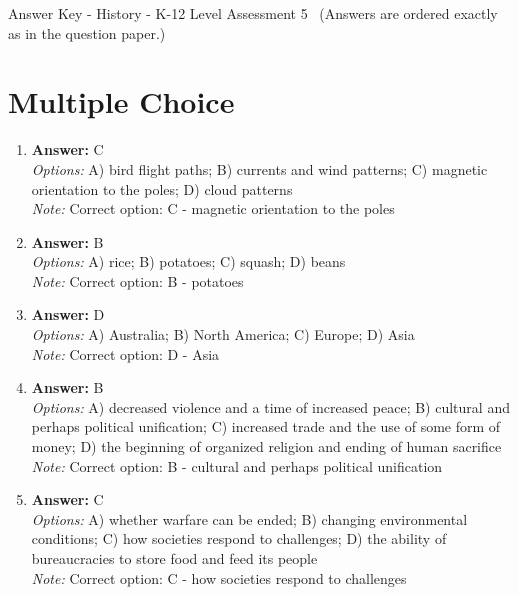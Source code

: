 \documentclass[12pt]{article}
\begin{document}
\begin{center}
Answer Key - History - K-12 Level Assessment 5 \
\small (Answers are ordered exactly as in the question paper.)
\end{center}

\section*{Multiple Choice}
\begin{enumerate}[label=\arabic*.]
\item \textbf{Answer:} C
\\ \textit{Options:} A) bird flight paths; B) currents and wind patterns; C) magnetic orientation to the poles; D) cloud patterns
\\ \textit{Note:} Correct option: C - magnetic orientation to the poles
\item \textbf{Answer:} B
\\ \textit{Options:} A) rice; B) potatoes; C) squash; D) beans
\\ \textit{Note:} Correct option: B - potatoes
\item \textbf{Answer:} D
\\ \textit{Options:} A) Australia; B) North America; C) Europe; D) Asia
\\ \textit{Note:} Correct option: D - Asia
\item \textbf{Answer:} B
\\ \textit{Options:} A) decreased violence and a time of increased peace; B) cultural and perhaps political unification; C) increased trade and the use of some form of money; D) the beginning of organized religion and ending of human sacrifice
\\ \textit{Note:} Correct option: B - cultural and perhaps political unification
\item \textbf{Answer:} C
\\ \textit{Options:} A) whether warfare can be ended; B) changing environmental conditions; C) how societies respond to challenges; D) the ability of bureaucracies to store food and feed its people
\\ \textit{Note:} Correct option: C - how societies respond to challenges
\end{enumerate}
\end{document}
